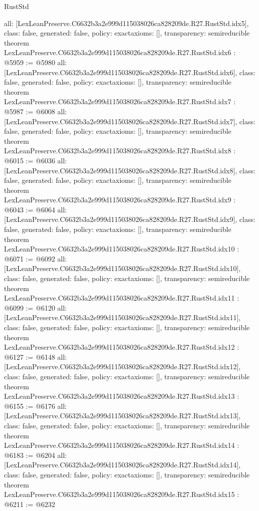 \begin{lexlean}{RustStd}
\begin{coremodule}
{  all: [LexLeanPreserve.C6632b3a2e999d115038026ca828209de.R27.RustStd.idx5],
  class: false,
  generated: false,
  policy: exact{axioms: []},
  transparency: semireducible
}
theorem LexLeanPreserve.C6632b3a2e999d115038026ca828209de.R27.RustStd.idx6 : @5959 := @5980 {
  all: [LexLeanPreserve.C6632b3a2e999d115038026ca828209de.R27.RustStd.idx6],
  class: false,
  generated: false,
  policy: exact{axioms: []},
  transparency: semireducible
}
theorem LexLeanPreserve.C6632b3a2e999d115038026ca828209de.R27.RustStd.idx7 : @5987 := @6008 {
  all: [LexLeanPreserve.C6632b3a2e999d115038026ca828209de.R27.RustStd.idx7],
  class: false,
  generated: false,
  policy: exact{axioms: []},
  transparency: semireducible
}
theorem LexLeanPreserve.C6632b3a2e999d115038026ca828209de.R27.RustStd.idx8 : @6015 := @6036 {
  all: [LexLeanPreserve.C6632b3a2e999d115038026ca828209de.R27.RustStd.idx8],
  class: false,
  generated: false,
  policy: exact{axioms: []},
  transparency: semireducible
}
theorem LexLeanPreserve.C6632b3a2e999d115038026ca828209de.R27.RustStd.idx9 : @6043 := @6064 {
  all: [LexLeanPreserve.C6632b3a2e999d115038026ca828209de.R27.RustStd.idx9],
  class: false,
  generated: false,
  policy: exact{axioms: []},
  transparency: semireducible
}
theorem LexLeanPreserve.C6632b3a2e999d115038026ca828209de.R27.RustStd.idx10 : @6071 := @6092 {
  all: [LexLeanPreserve.C6632b3a2e999d115038026ca828209de.R27.RustStd.idx10],
  class: false,
  generated: false,
  policy: exact{axioms: []},
  transparency: semireducible
}
theorem LexLeanPreserve.C6632b3a2e999d115038026ca828209de.R27.RustStd.idx11 : @6099 := @6120 {
  all: [LexLeanPreserve.C6632b3a2e999d115038026ca828209de.R27.RustStd.idx11],
  class: false,
  generated: false,
  policy: exact{axioms: []},
  transparency: semireducible
}
theorem LexLeanPreserve.C6632b3a2e999d115038026ca828209de.R27.RustStd.idx12 : @6127 := @6148 {
  all: [LexLeanPreserve.C6632b3a2e999d115038026ca828209de.R27.RustStd.idx12],
  class: false,
  generated: false,
  policy: exact{axioms: []},
  transparency: semireducible
}
theorem LexLeanPreserve.C6632b3a2e999d115038026ca828209de.R27.RustStd.idx13 : @6155 := @6176 {
  all: [LexLeanPreserve.C6632b3a2e999d115038026ca828209de.R27.RustStd.idx13],
  class: false,
  generated: false,
  policy: exact{axioms: []},
  transparency: semireducible
}
theorem LexLeanPreserve.C6632b3a2e999d115038026ca828209de.R27.RustStd.idx14 : @6183 := @6204 {
  all: [LexLeanPreserve.C6632b3a2e999d115038026ca828209de.R27.RustStd.idx14],
  class: false,
  generated: false,
  policy: exact{axioms: []},
  transparency: semireducible
}
theorem LexLeanPreserve.C6632b3a2e999d115038026ca828209de.R27.RustStd.idx15 : @6211 := @6232 {
}
\end{coremodule}
\end{lexlean}
